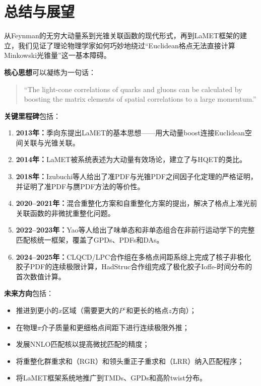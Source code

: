 \documentclass[12pt,a4paper]{ctexart}
\theoremstyle{definition}
\begin{document}
\section{总结与展望}

从Feynman的无穷大动量系到光锥关联函数的现代形式，再到LaMET框架的建立，我们见证了理论物理学家如何巧妙地绕过``Euclidean格点无法直接计算Minkowski光锥量''这一基本障碍。

\textbf{核心思想}可以凝练为一句话\cite{Ji2013Euclidean}：

\begin{quote}
``The light-cone correlations of quarks and gluons can be calculated by boosting the matrix elements of spatial correlations to a large momentum.''
\end{quote}

\textbf{关键里程碑}包括：

\begin{enumerate}
    \item \textbf{2013年：}季向东提出LaMET的基本思想——用大动量boost连接Euclidean空间关联与光锥关联\cite{Ji2013Euclidean}。
    \item \textbf{2014年：}LaMET被系统表述为大动量有效场论，建立了与HQET的类比\cite{Ji2014LaMET}。
    \item \textbf{2018年：}Izubuchi等人给出了准PDF与光锥PDF之间因子化定理的严格证明，并证明了准PDF与赝PDF方法的等价性\cite{Izubuchi2018}。
    \item \textbf{2020--2021年：}混合重整化方案\cite{Ji2021hybrid}和自重整化方案的提出，解决了格点上准光前关联函数的非微扰重整化问题。
    \item \textbf{2022--2023年：}Yao等人\cite{Yao2023}给出了味单态和非单态组合在非前行运动学下的完整匹配核统一框架，覆盖了GPDs、PDFs和DAs。
    \item \textbf{2024--2025年：}CLQCD/LPC合作组\cite{Chen2025gluon}在多格点间距系综上完成了核子非极化胶子PDF的连续极限计算，HadStruc合作组\cite{Egerer2022}完成了极化胶子Ioffe-时间分布的首次数值计算。
\end{enumerate}

\textbf{未来方向}包括：
\begin{itemize}
    \item 推进到更小的$x$区域（需要更大的$P^z$和更长的格点$z$方向）；
    \item 在物理$\pi$介子质量和更细格点间距下进行连续极限外推；
    \item 发展NNLO匹配核以提高微扰匹配的精度；
    \item 将重整化群重求和（RGR）和领头重正子重求和（LRR）纳入匹配程序\cite{Zhang2023RGR,Su2023LRR}；
    \item 将LaMET框架系统地推广到TMDs、GPDs和高阶twist分布。
\end{itemize}
\end{document}
